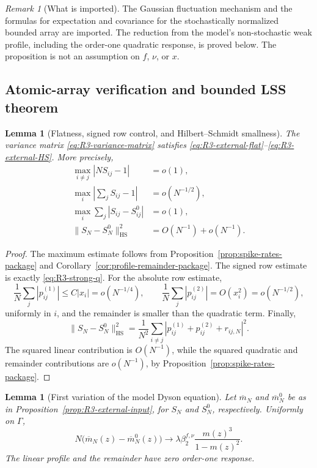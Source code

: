 \documentclass[11pt]{article}
\newtheorem{lemma}[theorem]{Lemma}
\theoremstyle{definition}
\theoremstyle{remark}
\newtheorem{remark}[theorem]{Remark}
\newcommand{\HS}{\mathrm{HS}}
\newcommand{\norm}[1]{\lVert #1\rVert}
\begin{document}
\begin{remark}[What is imported]
The Gaussian fluctuation mechanism and the formulas for expectation and
covariance
for the stochastically normalized bounded array are imported.  The reduction
from the model's non-stochastic weak profile, including the order-one
quadratic response, is proved below.  The proposition is not an assumption on
\(f\), \(\nu\), or \(x\).
\end{remark}

\subsection{Atomic-array verification and bounded LSS theorem}

\begin{lemma}[Flatness, signed row control, and Hilbert--Schmidt smallness]
\label{lem:R3-flatness}
The variance matrix \eqref{eq:R3-variance-matrix} satisfies
\eqref{eq:R3-external-flat}--\eqref{eq:R3-external-HS}.  More precisely,
\begin{align}
 \max_{i\ne j}|NS_{ij}-1|&=o(1),\label{eq:R3-flat-a}\\
 \max_i\left|\sum_jS_{ij}-1\right|&=o(N^{-1/2}),
 \label{eq:R3-flat-strong-row}\\
 \max_i\sum_j|S_{ij}-S_{ij}^0|&=o(1),\label{eq:R3-flat-b}\\
 \norm{S_N-S_N^0}_{\HS}^2&=O(N^{-1})+o(N^{-1}).
 \label{eq:R3-flat-c}
\end{align}
\end{lemma}

\begin{proof}
The maximum estimate follows from
Proposition~\ref{prop:spike-rates-package} and
Corollary~\ref{cor:profile-remainder-package}.  The signed row estimate is
exactly \eqref{eq:R3-strong-q}.  For the absolute row estimate,
\[
 \frac1N\sum_j|p_{ij}^{(1)}|
 \le C|x_i|=o(N^{-1/4}),\qquad
 \frac1N\sum_j|p_{ij}^{(2)}|=O(x_i^2)=o(N^{-1/2}),
\]
uniformly in \(i\), and the remainder is smaller than the quadratic term.
Finally,
\[
 \norm{S_N-S_N^0}_{\HS}^2
 =\frac1{N^2}\sum_{i\ne j}
 |p_{ij}^{(1)}+p_{ij}^{(2)}+r_{ij,N}|^2.
\]
The squared linear contribution is \(O(N^{-1})\), while the squared
quadratic and remainder contributions are \(o(N^{-1})\), by
Proposition~\ref{prop:spike-rates-package}.
\end{proof}

\begin{lemma}[First variation of the model Dyson equation]
\label{lem:R3-Dyson-response}
Let \(\overline m_N\) and \(\overline m_N^0\) be as in
Proposition~\ref{prop:R3-external-input}, for \(S_N\) and \(S_N^0\),
respectively.  Uniformly on \(\Gamma\),
\begin{equation}\label{eq:R3-Dyson-limit}
 N\bigl(\overline m_N(z)-\overline m_N^0(z)\bigr)
 \longrightarrow
 \lambda\beta_2^{f,\nu}
 \frac{m(z)^3}{1-m(z)^2}.
\end{equation}
The linear profile and the remainder have zero order-one response.
\end{lemma}
\end{document}
